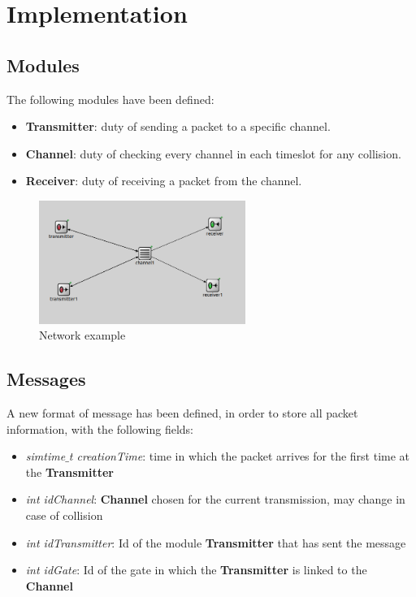 \section{Implementation}
\subsection{Modules}
The following modules have been defined:
\begin{itemize}
	\item \textbf{Transmitter}: duty of sending a packet to a specific channel.%
	\item \textbf{Channel}: duty of checking every channel in each timeslot for any collision.%
	\item \textbf{Receiver}: duty of receiving a packet from the channel.
\end{itemize}

\begin{figure}[H]
	\centering
	\includegraphics[width=0.6\textwidth]{img/network.png}
	\caption{Network example}
	\label {img: network}
\end{figure}

\subsection{Messages}
A new format of message has been defined, in order to store all packet information, with the following fields:
\begin{itemize}
	\item \textit{simtime$\_$t creationTime}: time in which the packet arrives for the first time at the \textbf{Transmitter}
	\item \textit{int idChannel}: \textbf{Channel} chosen for the current transmission, may change in case of collision
	\item \textit{int idTransmitter}: Id of the module \textbf{Transmitter} that has sent the message
	\item \textit{int idGate}: Id of the gate in which the \textbf{Transmitter} is linked to the \textbf{Channel}
\end{itemize}

